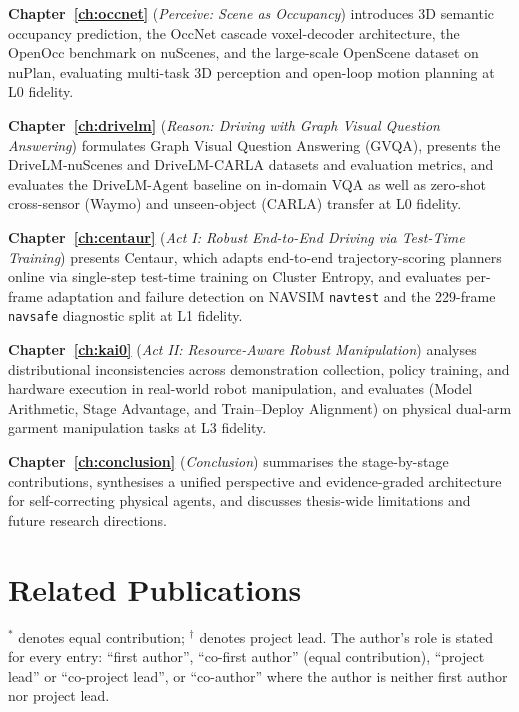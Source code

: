 \textbf{Chapter~\ref{ch:occnet}} (\emph{Perceive: Scene as Occupancy}) introduces 3D semantic occupancy prediction, the OccNet cascade voxel-decoder architecture, the OpenOcc benchmark on nuScenes, and the large-scale OpenScene dataset on nuPlan, evaluating multi-task 3D perception and open-loop motion planning at L0 fidelity.

\textbf{Chapter~\ref{ch:drivelm}} (\emph{Reason: Driving with Graph Visual Question Answering}) formulates Graph Visual Question Answering (GVQA), presents the DriveLM-nuScenes and DriveLM-CARLA datasets and evaluation metrics, and evaluates the DriveLM-Agent baseline on in-domain VQA as well as zero-shot cross-sensor (Waymo) and unseen-object (CARLA) transfer at L0 fidelity.

\textbf{Chapter~\ref{ch:centaur}} (\emph{Act I: Robust End-to-End Driving via Test-Time Training}) presents Centaur, which adapts end-to-end trajectory-scoring planners online via single-step test-time training on Cluster Entropy, and evaluates per-frame adaptation and failure detection on NAVSIM \texttt{navtest} and the 229-frame \texttt{navsafe} diagnostic split at L1 fidelity.

\textbf{Chapter~\ref{ch:kai0}} (\emph{Act II: Resource-Aware Robust Manipulation}) analyses distributional inconsistencies across demonstration collection, policy training, and hardware execution in real-world robot manipulation, and evaluates \chiz (Model Arithmetic, Stage Advantage, and Train--Deploy Alignment) on physical dual-arm garment manipulation tasks at L3 fidelity.

\textbf{Chapter~\ref{ch:conclusion}} (\emph{Conclusion}) summarises the stage-by-stage contributions, synthesises a unified perspective and evidence-graded architecture for self-correcting physical agents, and discusses thesis-wide limitations and future research directions.

\section{Related Publications}\label{sec:intro:publications}

\noindent $^{*}$ denotes equal contribution; $^{\dagger}$ denotes project lead. The author's role is stated for every entry: ``first author'', ``co-first author'' (equal contribution), ``project lead'' or ``co-project lead'', or ``co-author'' where the author is neither first author nor project lead.

